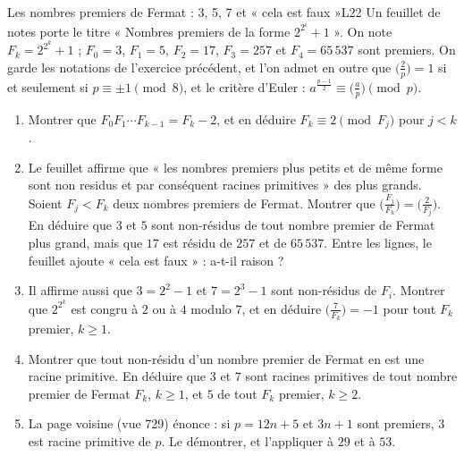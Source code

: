 \documentclass[11pt,a4paper]{article}
\begin{document}
\begin{exercice}{Les nombres premiers de Fermat : 3, 5, 7 et « cela est faux »}{L2}{2}
Un feuillet de notes porte le titre « Nombres premiers de la forme $2^{2^i}+1$ ». On
note $F_k = 2^{2^k} + 1$ ; $F_0 = 3$, $F_1 = 5$, $F_2 = 17$, $F_3 = 257$ et
$F_4 = 65\,537$ sont premiers. On garde les notations de l'exercice précédent, et l'on
admet en outre que $\bigl(\frac2p\bigr) = 1$ si et seulement si $p \equiv \pm1
\pmod 8$, et le critère d'Euler : $a^{\frac{p-1}{2}} \equiv \bigl(\frac ap\bigr)
\pmod p$.
\begin{enumerate}
\item Montrer que $F_0F_1\cdots F_{k-1} = F_k - 2$, et en déduire $F_k \equiv 2
  \pmod{F_j}$ pour $j < k$.
\item Le feuillet affirme que « les nombres premiers plus petits et de même forme sont
  non residus et par conséquent racines primitives » des plus grands. Soient
  $F_j < F_k$ deux nombres premiers de Fermat. Montrer que $\bigl(\frac{F_j}{F_k}\bigr)
  = \bigl(\frac{2}{F_j}\bigr)$. En déduire que $3$ et $5$ sont non-résidus de tout
  nombre premier de Fermat plus grand, mais que $17$ est résidu de $257$ et de
  $65\,537$. Entre les lignes, le feuillet ajoute « cela est faux » : a-t-il raison ?
\item Il affirme aussi que $3 = 2^2 - 1$ et $7 = 2^3 - 1$ sont non-résidus de $F_i$.
  Montrer que $2^{2^k}$ est congru à $2$ ou à $4$ modulo $7$, et en déduire
  $\bigl(\frac{7}{F_k}\bigr) = -1$ pour tout $F_k$ premier, $k \ge 1$.
\item Montrer que tout non-résidu d'un nombre premier de Fermat en est une racine
  primitive. En déduire que $3$ et $7$ sont racines primitives de tout nombre premier de
  Fermat $F_k$, $k \ge 1$, et $5$ de tout $F_k$ premier, $k \ge 2$.
\item La page voisine (vue 729) énonce : si $p = 12n + 5$ et $3n + 1$ sont premiers,
  $3$ est racine primitive de $p$. Le démontrer, et l'appliquer à $29$ et à $53$.
\end{enumerate}
\end{exercice}
\end{document}
